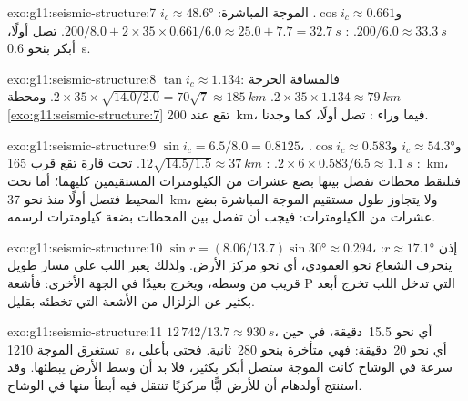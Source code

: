 \begin{solution}{exo:g11:seismic-structure:7}
$i_c \approx \ang{48.6}$ و$\cos i_c \approx 0.661$. الموجة المباشرة: $200/6.0
\approx \qty{33.3}{s}$. : $200/8.0 + 2 \times 35 \times 0.661/6.0
\approx 25.0 + 7.7 = \qty{32.7}{s}$.  تصل أولًا، أبكر
بنحو \qty{0.6}{s}.
\end{solution}

\begin{solution}{exo:g11:seismic-structure:8}
$\tan i_c \approx 1.134$: فالمسافة الحرجة $2 \times 35 \times 1.134
\approx \qty{79}{km}$.  $2 \times 35 \times
\sqrt{14.0/2.0} = 70\sqrt 7 \approx \qty{185}{km}$. ومحطة
\cref{exo:g11:seismic-structure:7} تقع عند \qty{200}{km}، فيما وراء
:  تصل أولًا، كما وجدنا.
\end{solution}

\begin{solution}{exo:g11:seismic-structure:9}
$\sin i_c = 6.5/8.0 = 0.8125$، و$i_c \approx \ang{54.3}$ و$\cos i_c \approx
0.583$. : $2 \times 6 \times 0.583/6.5 \approx \qty{1.1}{s}$.
: $12\sqrt{14.5/1.5} \approx \qty{37}{km}$. تحت
قارة تقع  قرب \qty{165}{km}، فتلتقط محطات تفصل بينها بضع عشرات من
الكيلومترات المستقيمين كليهما؛ أما تحت المحيط فتصل 
أولًا منذ نحو \qty{37}{km}، ولا يتجاوز طول مستقيم الموجة المباشرة
بضع عشرات من الكيلومترات: فيجب أن تفصل بين المحطات بضعة كيلومترات
لرسمه.
\end{solution}

\begin{solution}{exo:g11:seismic-structure:10}
$\sin r = (8.06/13.7)\sin\ang{30} \approx 0.294$، إذن $r \approx \ang{17.1}$:
ينحرف الشعاع نحو العمودي، أي نحو مركز
الأرض. ولذلك يعبر اللب على مسار طويل قريب من وسطه،
ويخرج بعيدًا في الجهة الأخرى: فأشعة P التي تدخل اللب
تخرج أبعد بكثير عن الزلزال من الأشعة التي تخطئه بقليل.
\end{solution}

\begin{solution}{exo:g11:seismic-structure:11}
$12\,742/13.7 \approx \qty{930}{s}$، أي نحو 15.5~دقيقة، في حين تستغرق الموجة
\qty{1210}{s}، أي نحو 20~دقيقة: فهي متأخرة بنحو 280~ثانية. فحتى بأعلى
سرعة في الوشاح كانت الموجة ستصل أبكر بكثير، فلا بد أن
وسط الأرض يبطئها. وقد استنتج أولدهام أن للأرض لبًّا
مركزيًا تنتقل فيه  أبطأ منها في الوشاح.
\end{solution}

